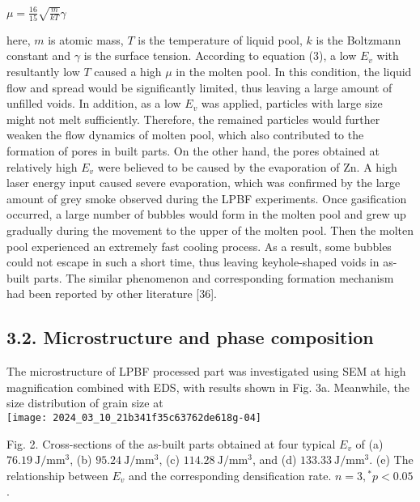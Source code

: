 \documentclass[10pt]{article}
\begin{document}
$\mu=\frac{16}{15} \sqrt{\frac{m}{k T}} \gamma$

here, $m$ is atomic mass, $T$ is the temperature of liquid pool, $k$ is the Boltzmann constant and $\gamma$ is the surface tension. According to equation (3), a low $E_{v}$ with resultantly low $T$ caused a high $\mu$ in the molten pool. In this condition, the liquid flow and spread would be significantly limited, thus leaving a large amount of unfilled voids. In addition, as a low $E_{v}$ was applied, particles with large size might not melt sufficiently. Therefore, the remained particles would further weaken the flow dynamics of molten pool, which also contributed to the formation of pores in built parts. On the other hand, the pores obtained at relatively high $E_{v}$ were believed to be caused by the evaporation of $\mathrm{Zn}$. A high laser energy input caused severe evaporation, which was confirmed by the large amount of grey smoke observed during the LPBF experiments. Once gasification occurred, a large number of bubbles would form in the molten pool and grew up gradually during the movement to the upper of the molten pool. Then the molten pool experienced an extremely fast cooling process. As a result, some bubbles could not escape in such a short time, thus leaving keyhole-shaped voids in as-built parts. The similar phenomenon and corresponding formation mechanism had been reported by other literature [36].

\subsection*{3.2. Microstructure and phase composition}
The microstructure of LPBF processed part was investigated using SEM at high magnification combined with EDS, with results shown in Fig. 3a. Meanwhile, the size distribution of grain size at\\
\texttt{[image: 2024\_03\_10\_21b341f35c63762de618g-04]}

Fig. 2. Cross-sections of the as-built parts obtained at four typical $E_{v}$ of (a) $76.19 \mathrm{~J} / \mathrm{mm}^{3}$, (b) $95.24 \mathrm{~J} / \mathrm{mm}^{3}$, (c) $114.28 \mathrm{~J} / \mathrm{mm}^{3}$, and (d) $133.33 \mathrm{~J} / \mathrm{mm}^{3}$. (e) The relationship between $E_{v}$ and the corresponding densification rate. $n=3,{ }^{*} p<0.05$.
\end{document}
